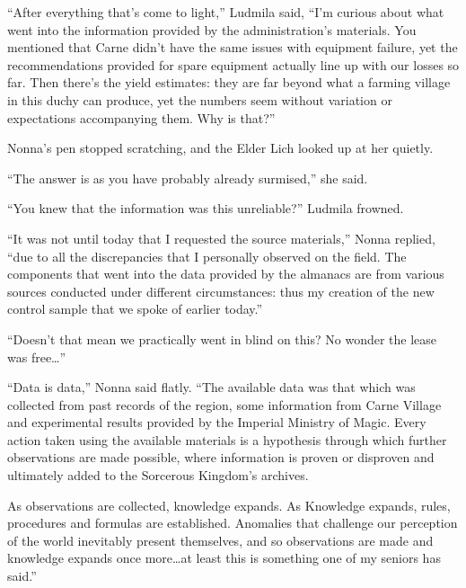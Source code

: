  

“After everything that’s come to light,” Ludmila said, “I’m curious about what went into the information provided by the administration’s materials. You mentioned that Carne didn’t have the same issues with equipment failure, yet the recommendations provided for spare equipment actually line up with our losses so far. Then there’s the yield estimates: they are far beyond what a farming village in this duchy can produce, yet the numbers seem without variation or expectations accompanying them. Why is that?”

 

Nonna’s pen stopped scratching, and the Elder Lich looked up at her quietly.

 

“The answer is as you have probably already surmised,” she said.

 

“You knew that the information was this unreliable?” Ludmila frowned.

 

“It was not until today that I requested the source materials,” Nonna replied, “due to all the discrepancies that I personally observed on the field. The components that went into the data provided by the almanacs are from various sources conducted under different circumstances: thus my creation of the new control sample that we spoke of earlier today.”

 

“Doesn’t that mean we practically went in blind on this? No wonder the lease was free…”

 

“Data is data,” Nonna said flatly. “The available data was that which was collected from past records of the region, some information from Carne Village and experimental results provided by the Imperial Ministry of Magic. Every action taken using the available materials is a hypothesis through which further observations are made possible, where information is proven or disproven and ultimately added to the Sorcerous Kingdom’s archives.

 

As observations are collected, knowledge expands. As Knowledge expands, rules, procedures and formulas are established. Anomalies that challenge our perception of the world inevitably present themselves, and so observations are made and knowledge expands once more…at least this is something one of my seniors has said.”


